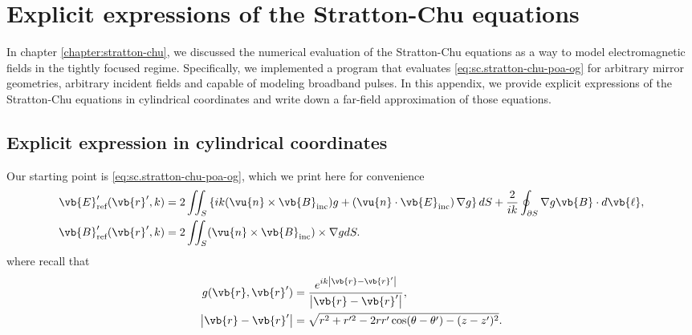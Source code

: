 \documentclass[11pt,SymmetricalJury]{inrsthesis/inrsthesis}
\begin{document}
\chapter{Explicit expressions of the Stratton-Chu equations}
\label{app.explicit-sc}

In chapter \ref{chapter:stratton-chu}, we discussed the numerical evaluation
of the Stratton-Chu equations as a way to model electromagnetic fields in the
tightly focused regime. Specifically, we implemented a program that evaluates
\eqref{eq:sc.stratton-chu-poa-og} for arbitrary mirror geometries, arbitrary incident fields and capable
of modeling broadband pulses. In this appendix, we provide explicit expressions
of the Stratton-Chu equations in cylindrical coordinates and write down a far-field
approximation of those equations.

\section{Explicit expression in cylindrical coordinates}

Our starting point is \eqref{eq:sc.stratton-chu-poa-og}, which we print here for convenience
  \begin{subequations}
  \label{eq:app.sc-explicit.poa-og}
  \begin{align}
    \label{eq:app.sc-explicit.poa-og.efield}
    \vb{E}'_\text{ref}(\vb{r}',k)  &= 2\iint_S
      \left\{
        ik(\vu{n}\times\vb{B}_\text{inc})g
        +\left(\vu{n}\cdot\vb{E}_\text{inc}\right)\nabla g\right\}dS
            + \frac{2}{ik}\oint_{\partial S}\nabla g
                    \vb{B}\cdot d\vb{\ell},\\
    \label{eq:app.sc-explicit.poa-og.bfield}
    \vb{B}'_\text{ref}(\vb{r}',k)  &= 2\iint_S (\vu{n}\times\vb{B}_\text{inc})\times\nabla g dS.
  \end{align}
  \end{subequations}
where recall that
  \begin{align}
    g(\vb{r},\vb{r}') &= \frac{e^{ik\left|\vb{r}-\vb{r}'\right|}}{\left|\vb{r}-\vb{r}'\right|}, \\
    \left|\vb{r}-\vb{r}'\right| &= \sqrt{r^2+r'^2-2rr'\cos(\theta-\theta')-(z-z')^2}.
  \end{align}
\end{document}
